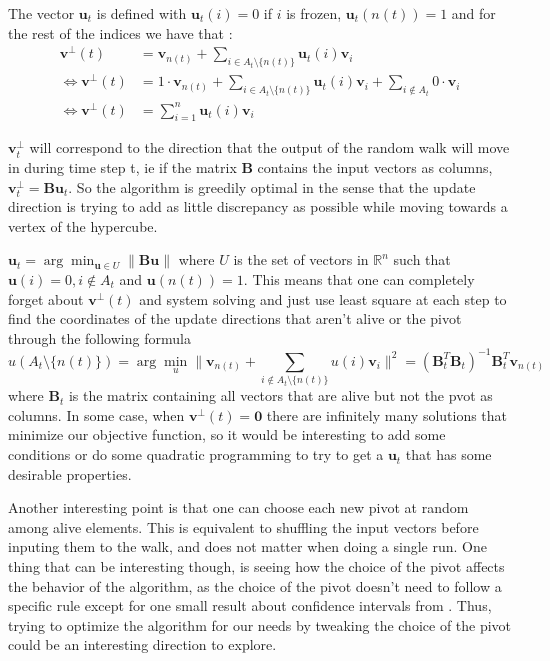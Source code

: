 \documentclass[12pt]{article}
\begin{document}
The vector $\textbf{u}_t$ is defined with $\textbf{u}_t(i)=0$ if $i$ is frozen, $\textbf{u}_t(n(t))=1$ and for the rest of the indices we have that :
\begin{align*}
\textbf{v}^\perp(t) &= \textbf{v}_{n(t)} + \sum_{i \in A_t \setminus \{n(t)\}} \textbf{u}_t(i)\textbf{v}_i\\
\Leftrightarrow \textbf{v}^\perp(t) &= 1 \cdot \textbf{v}_{n(t)} + \sum_{i \in A_t \setminus \{n(t)\}} \textbf{u}_t(i)\textbf{v}_i + \sum_{i \notin A_t} 0 \cdot \textbf{v}_i\\
\Leftrightarrow \textbf{v}^\perp(t) &= \sum_{i=1}^n \textbf{u}_t(i)\textbf{v}_i
\end{align*}

$\textbf{v}^\perp_t$ will correspond to the direction that the output of the random walk will move in during time step t, ie if the matrix $\textbf{B}$ contains the input vectors as columns, $\textbf{v}^\perp_t = \textbf{Bu}_t$. So the algorithm is greedily optimal in the sense that the update direction is trying to add as little discrepancy as possible while moving towards a vertex of the hypercube.

$\textbf{u}_t = \arg\min_{\textbf{u} \in U} \|\textbf{Bu}\|$ where $U$ is the set of vectors in $\mathbb{R}^n$ such that $\textbf{u}(i) = 0 , i \not\in A_t$ and $\textbf{u}(n(t))=1$. This means that one can completely forget about $\textbf{v}^\perp(t)$ and system solving and just use least square at each step to find the coordinates of the update directions that aren't alive or the pivot through the following formula $$u(A_t\setminus\{n(t)\})=\arg\min_u\|\textbf{v}_{n(t)}+\sum_{i\not\in A_t\setminus\{n(t)\}}u(i)\textbf{v}_i\|^2=(\textbf{B}_t^T\textbf{B}_t)^{-1}\textbf{B}_t^T\textbf{v}_{n(t)}$$ where $\textbf{B}_t$ is the matrix containing all vectors that are alive but not the pvot as columns. In some case, when $\textbf{v}^\perp(t)=\textbf{0}$ there are infinitely many solutions that minimize our objective function, so it would be interesting to add some conditions or do some quadratic programming to try to get a $\textbf{u}_t$ that has some desirable properties.

Another interesting point is that one can choose each new pivot at random among alive elements. This is equivalent to shuffling the input vectors before inputing them to the walk, and does not matter when doing a single run. One thing that can be interesting though, is seeing how the choice of the pivot affects the behavior of the algorithm, as the choice of the pivot doesn't need to follow a specific rule except for one small result about confidence intervals from \cite{harshaw2019balancing}. Thus, trying to optimize the algorithm for our needs by tweaking the choice of the pivot could be an interesting direction to explore.
\end{document}
